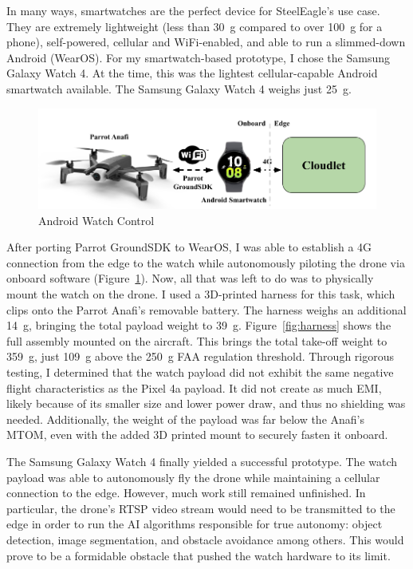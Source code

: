 In many ways, smartwatches are the perfect device for SteelEagle's use case. They are extremely lightweight (less than 30~g compared to over 100~g for a phone), self-powered, cellular and WiFi-enabled, and able to run a slimmed-down Android (WearOS). For my smartwatch-based prototype, I chose the Samsung Galaxy Watch 4. At the time, this was the lightest cellular-capable Android smartwatch available. The Samsung Galaxy Watch 4 weighs just 25~g.

\begin{figure}
    \centering
    \includegraphics[width=1.0\linewidth]{chapter3/FIGS/onboard-watch.png}
    \caption{Android Watch Control~\cite{ParrotAnafi}}
    \label{fig:watch-control}
\end{figure}

After porting Parrot GroundSDK to WearOS, I was able to establish a 4G connection from the edge to the watch while autonomously piloting the drone via onboard software (Figure~\ref{fig:watch-control}). Now, all that was left to do was to physically mount the watch on the drone. I used a 3D-printed harness for this task, which clips onto the Parrot Anafi's removable battery. The harness weighs an additional 14~g, bringing the total payload weight to 39~g. Figure~\ref{fig:harness} shows the full assembly mounted on the aircraft. This brings the total take-off weight to 359~g, just 109~g above the 250~g FAA regulation threshold. Through rigorous testing, I determined that the watch payload did not exhibit the same negative flight characteristics as the Pixel 4a payload. It did not create as much EMI, likely because of its smaller size and lower power draw, and thus no shielding was needed. Additionally, the weight of the payload was far below the Anafi's MTOM, even with the added 3D printed mount to securely fasten it onboard.

The Samsung Galaxy Watch 4 finally yielded a successful prototype. The watch payload was able to autonomously fly the drone while maintaining a cellular connection to the edge. However, much work still remained unfinished. In particular, the drone's RTSP video stream would need to be transmitted to the edge in order to run the AI algorithms responsible for true autonomy: object detection, image segmentation, and obstacle avoidance among others. This would prove to be a formidable obstacle that pushed the watch hardware to its limit.

